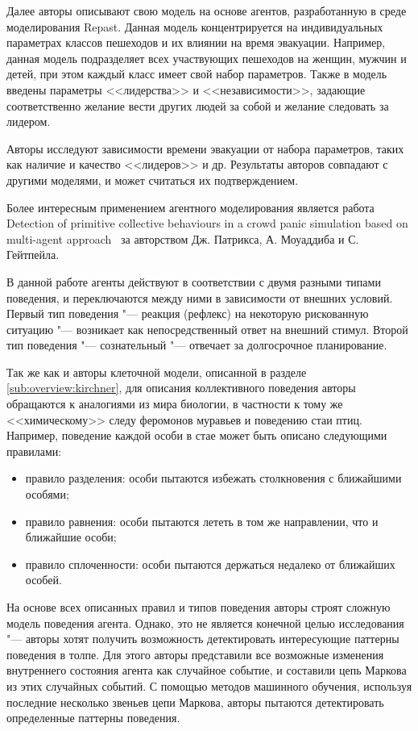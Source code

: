 Далее авторы описывают свою модель на основе агентов, разработанную в среде моделирования Repast.
Данная модель концентрируется на индивидуальных параметрах классов пешеходов и их влиянии на время эвакуации.
Например, данная модель подразделяет всех участвующих пешеходов на женщин, мужчин и детей, при этом каждый класс имеет свой набор параметров.
Также в модель введены параметры <<лидерства>> и <<независимости>>, задающие соответственно желание вести других людей за собой и желание следовать за лидером.

Авторы исследуют зависимости времени эвакуации от набора параметров, таких как наличие и качество <<лидеров>> и др.
Результаты авторов совпадают с другими моделями, и может считаться их подтверждением.

Более интересным применением агентного моделирования является работа Detection of primitive collective behaviours in a crowd panic simulation based on multi-agent approach~\cite{patrix2012detection} за авторством Дж. Патрикса, А. Моуаддиба и С. Гейтпейла.

В данной работе агенты действуют в соответствии с двумя разными типами поведения, и переключаются между ними в зависимости от внешних условий.
Первый тип поведения "--- реакция (рефлекс) на некоторую рискованную ситуацию "--- возникает как непосредственный ответ на внешний стимул.
Второй тип поведения "--- сознательный "--- отвечает за долгосрочное планирование.

Так же как и авторы клеточной модели, описанной в разделе \ref{sub:overview:kirchner}, для описания коллективного поведения авторы обращаются к аналогиями из мира биологии,
в частности к тому же <<химическому>> следу феромонов муравьев и поведению стаи птиц.
Например, поведение каждой особи в стае может быть описано следующими правилами:

\begin{itemize}
  \item правило разделения: особи пытаются избежать столкновения с ближайшими особями;
  \item правило равнения: особи пытаются лететь в том же направлении, что и ближайшие особи;
  \item правило сплоченности: особи пытаются держаться недалеко от ближайших особей.
\end{itemize}

На основе всех описанных правил и типов поведения авторы строят сложную модель поведения агента.
Однако, это не является конечной целью исследования "--- авторы хотят получить возможность детектировать интересующие паттерны поведения в толпе.
Для этого авторы представили все возможные изменения внутреннего состояния агента как случайное событие, и составили цепь Маркова из этих случайных событий.
С помощью методов машинного обучения, используя последние несколько звеньев цепи Маркова, авторы пытаются детектировать определенные паттерны поведения.

